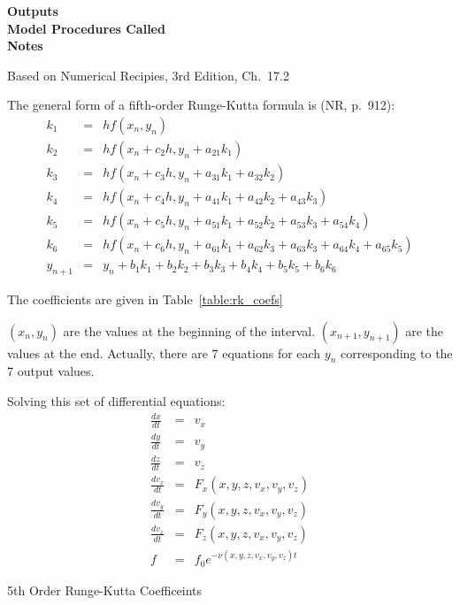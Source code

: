 \documentclass[11pt]{article}
\newcommand\descrip[1]{\textsf{\textbf{\large{#1}}}\\}
\begin{document}
\descrip{Outputs}

\descrip{Model Procedures Called}

\descrip{Notes}
\begin{compactenum}
\item Based on Numerical Recipies, 3rd Edition, Ch.\ 17.2
\item The general form of a fifth-order Runge-Kutta formula is (NR, p.\ 912):
  \begin{eqnarray}
  k_1 & = & h f(x_n,y_n) \\
  k_2 & = & h f(x_n+c_2 h, y_n + a_{21} k_1) \\
  k_3 & = & h f(x_n+c_3 h, y_n + a_{31} k_1 + a_{32} k_2) \\
  k_4 & = & h f(x_n+c_4 h, y_n + a_{41} k_1 + a_{42} k_2 + a_{43} k_3) \\
  k_5 & = & h f(x_n+c_5 h, y_n + a_{51} k_1 + a_{52} k_2 + a_{53} k_3 + a_{54} k_4) \\
  k_6 & = & h f(x_n+c_6 h, y_n + a_{61} k_1 + a_{62} k_3 + a_{63} k_3 + a_{64} k_4 +
    a_{65} k_5) \\
  y_{n+1} & = & y_n + b_1 k_1 + b_2 k_2 + b_3 k_3 + b_4 k_4 + b_5 k_5 + b_6 k_6
  \end{eqnarray}
\item The coefficients are given in Table~\ref{table:rk_coefs}
\item $(x_n, y_n)$ are the values at the beginning of the interval. $(x_{n+1},y_{n+1})$
are the values at the end. Actually, there are 7 equations for each $y_n$ corresponding
to the 7 output values.
\item Solving this set of differential equations:
  \begin{eqnarray}
  \frac{dx}{dt} & = & v_x \\
  \frac{dy}{dt} & = & v_y \\
  \frac{dz}{dt} & = & v_z \\
  \frac{dv_x}{dt} & = & F_x(x,y,z,v_x,v_y,v_z) \\
  \frac{dv_y}{dt} & = & F_y(x,y,z,v_x,v_y,v_z) \\
  \frac{dv_z}{dt} & = & F_z(x,y,z,v_x,v_y,v_z) \\
  f & = & f_0 e^{-\nu(x,y,z,v_x,v_y,v_z) t}
  \end{eqnarray}
  
\begin{table}
\caption{5th Order Runge-Kutta Coefficeints}
\label{table:rk_coefs}
\end{table}

\end{compactenum}
\end{document}
